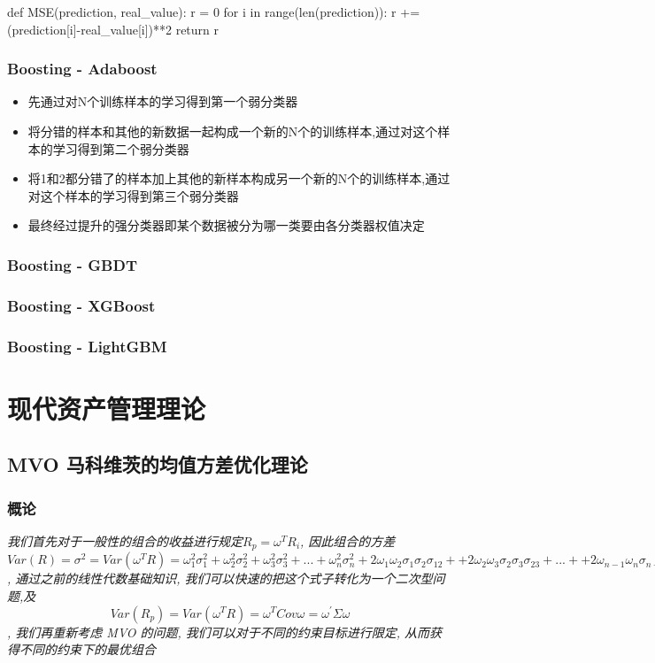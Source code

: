\documentclass{scrartcl}
\numberwithin{equation}{section}
\begin{document}
\begin{python}
def MSE(prediction, real_value):
    r = 0
    for i in range(len(prediction)):
        r += (prediction[i]-real_value[i])**2
    return r
\end{python}
\subsubsection{Boosting - Adaboost}
\begin{itemize}
    \item 先通过对N个训练样本的学习得到第一个弱分类器
    \item 将分错的样本和其他的新数据一起构成一个新的N个的训练样本,通过对这个样本的学习得到第二个弱分类器
    \item 将1和2都分错了的样本加上其他的新样本构成另一个新的N个的训练样本,通过对这个样本的学习得到第三个弱分类器
    \item  最终经过提升的强分类器即某个数据被分为哪一类要由各分类器权值决定
\end{itemize}

\subsubsection{Boosting - GBDT}

\subsubsection{Boosting - XGBoost}
\subsubsection{Boosting - LightGBM}

\section{现代资产管理理论}
\subsection{MVO 马科维茨的均值方差优化理论}
\subsubsection{概论}
\textsl{
    我们首先对于一般性的组合的收益进行规定$R_p =  \omega^T R_i$, 因此组合的方差 $Var(R) = \sigma^2= Var(\omega^T R) = \omega_1^2\sigma_1^2 + \omega_2^2\sigma_2^2+  \omega_3^2\sigma_3^2+ ... +  \omega_n^2\sigma_n^2 + 2  \omega_1\omega_2\sigma_1\sigma_2\sigma_{12}+ + 2  \omega_2\omega_3\sigma_2\sigma_3\sigma_{23} + ... + + 2  \omega_{n-1}\omega_n\sigma_{n-1}\sigma_n\sigma_{n-1, n}$, 通过之前的线性代数基础知识, 我们可以快速的把这个式子转化为一个二次型问题,及$$Var(R_p) = Var(\omega^T R) = \omega^T Cov \omega= \omega^{'}  \Sigma \omega $$, 我们再重新考虑 MVO 的问题, 我们可以对于不同的约束目标进行限定, 从而获得不同的约束下的最优组合}
\end{document}
